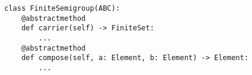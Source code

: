 \begin{verbatim}
class FiniteSemigroup(ABC):
    @abstractmethod
    def carrier(self) -> FiniteSet:
        ...
    @abstractmethod
    def compose(self, a: Element, b: Element) -> Element:
        ...
\end{verbatim}